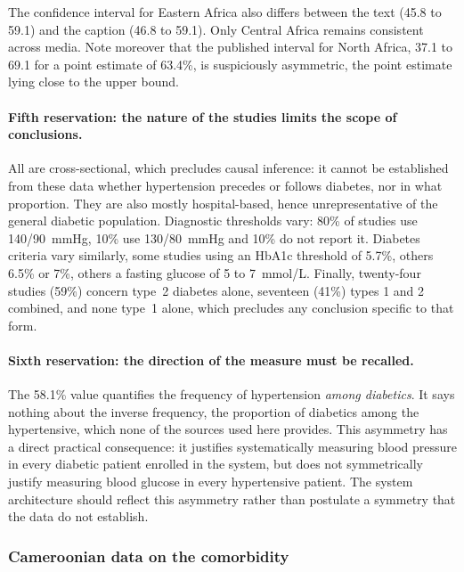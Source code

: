 \documentclass[12pt,a4paper,oneside]{report}
\begin{document}
The confidence interval for Eastern Africa also differs between the text (45.8 to 59.1) and the caption (46.8 to 59.1). Only Central Africa remains consistent across media. Note moreover that the published interval for North Africa, 37.1 to 69.1 for a point estimate of 63.4\%, is suspiciously asymmetric, the point estimate lying close to the upper bound.

\paragraph{Fifth reservation: the nature of the studies limits the scope of conclusions.} All are cross-sectional, which precludes causal inference: it cannot be established from these data whether hypertension precedes or follows diabetes, nor in what proportion. They are also mostly hospital-based, hence unrepresentative of the general diabetic population. Diagnostic thresholds vary: 80\% of studies use 140/90~mmHg, 10\% use 130/80~mmHg and 10\% do not report it. Diabetes criteria vary similarly, some studies using an HbA1c threshold of 5.7\%, others 6.5\% or 7\%, others a fasting glucose of 5 to 7~mmol/L. Finally, twenty-four studies (59\%) concern type~2 diabetes alone, seventeen (41\%) types 1 and 2 combined, and none type~1 alone, which precludes any conclusion specific to that form.

\paragraph{Sixth reservation: the direction of the measure must be recalled.} The 58.1\% value quantifies the frequency of hypertension \emph{among diabetics}. It says nothing about the inverse frequency, the proportion of diabetics among the hypertensive, which none of the sources used here provides. This asymmetry has a direct practical consequence: it justifies systematically measuring blood pressure in every diabetic patient enrolled in the system, but does not symmetrically justify measuring blood glucose in every hypertensive patient. The system architecture should reflect this asymmetry rather than postulate a symmetry that the data do not establish.

\subsubsection{Cameroonian data on the comorbidity}
\end{document}

